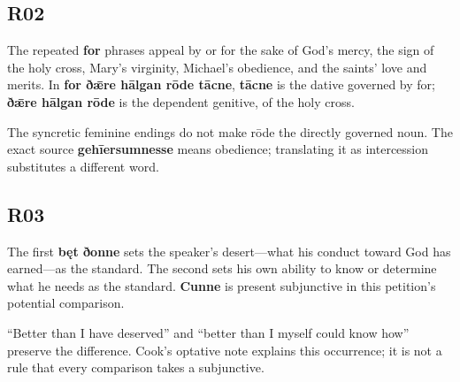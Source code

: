 \subsection*{R02}

\par\begin{minipage}{\linewidth}\raggedright
The repeated \textbf{for} phrases appeal by or for the sake of God’s mercy, the sign of the holy cross, Mary’s virginity, Michael’s obedience, and the saints’ love and merits. In \textbf{for ðǣre hālgan rōde tācne}, \textbf{tācne} is the dative governed by for; \textbf{ðǣre hālgan rōde} is the dependent genitive, of the holy cross.

The syncretic feminine endings do not make rōde the directly governed noun. The exact source \textbf{gehīersumnesse} means obedience; translating it as intercession substitutes a different word.

\end{minipage}\par\addvspace{4pt}

\subsection*{R03}

\par\begin{minipage}{\linewidth}\raggedright
The first \textbf{bęt ðonne} sets the speaker’s desert—what his conduct toward God has earned—as the standard. The second sets his own ability to know or determine what he needs as the standard. \textbf{Cunne} is present subjunctive in this petition’s potential comparison.

“Better than I have deserved” and “better than I myself could know how” preserve the difference. Cook’s optative note explains this occurrence; it is not a rule that every comparison takes a subjunctive.

\end{minipage}\par\addvspace{4pt}


